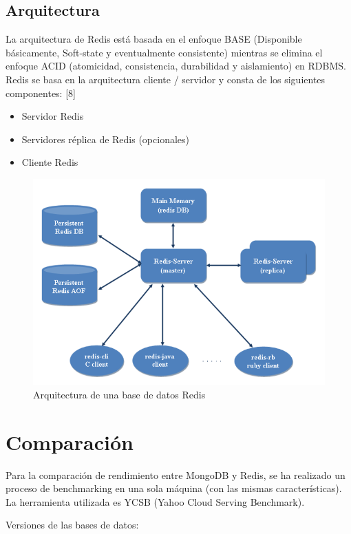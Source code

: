 \documentclass[twocolumn]{article}
\begin{document}
\subsection{Arquitectura}

La arquitectura de Redis está basada en el enfoque BASE (Disponible básicamente, Soft-state y eventualmente consistente) mientras se elimina el enfoque ACID (atomicidad, consistencia, durabilidad y aislamiento) en RDBMS. Redis se basa en la arquitectura cliente / servidor y consta de los siguientes componentes: [8]

\begin{itemize}
  \item Servidor Redis
  \item Servidores réplica de Redis (opcionales)
  \item Cliente Redis
\end{itemize}

\begin{figure}[h]
  \includegraphics[width = \columnwidth]{img/02_redis.png}
  \caption{Arquitectura de una base de datos Redis}
\end{figure}

\section{Comparación}

Para la comparación de rendimiento entre MongoDB y Redis, se ha realizado un proceso de benchmarking en una sola máquina (con las mismas características). La herramienta utilizada es YCSB (Yahoo Cloud Serving Benchmark).

Versiones de las bases de datos:
\end{document}
